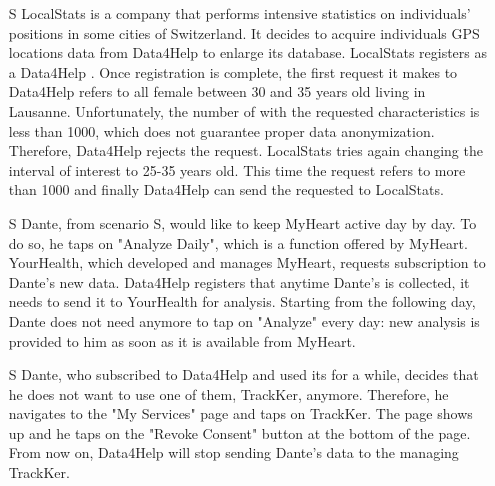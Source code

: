 \documentclass[../../rasd.tex]{subfiles}
\begin{document}
\begin{itemize}
                    \item[S\subs{4}] LocalStats is a company that performs intensive statistics on individuals' positions in some cities of Switzerland. It decides to acquire individuals GPS locations data from Data4Help to enlarge its database. LocalStats registers as a Data4Help . Once registration is complete, the first request it makes to Data4Help refers to all female  between 30 and 35 years old living in Lausanne. Unfortunately, the number of  with the requested characteristics is less than 1000, which does not guarantee proper data anonymization. Therefore, Data4Help rejects the  request. LocalStats tries again changing the interval of interest to 25-35 years old. This time the request refers to more than 1000  and finally Data4Help can send the requested  to LocalStats.

                    \item[S\subs{5}] Dante, from scenario S, would like to keep MyHeart active day by day. To do so, he taps on "Analyze Daily", which is a function offered by MyHeart. YourHealth, which developed and manages MyHeart, requests subscription to Dante's new data. Data4Help registers that anytime Dante's  is collected, it needs to send it to YourHealth for analysis. Starting from the following day, Dante does not need anymore to tap on "Analyze" every day: new analysis is provided to him as soon as it is available from MyHeart.

                    \item[S\subs{6}] Dante, who subscribed to Data4Help and used its  for a while, decides that he does not want to use one of them, TrackKer, anymore. Therefore, he navigates to the "My Services" page and taps on TrackKer. The  page shows up and he taps on the "Revoke Consent" button at the bottom of the page. From now on, Data4Help will stop sending Dante's data to the  managing TrackKer.
                \end{itemize}
\end{document}
